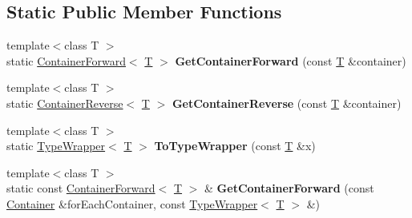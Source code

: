 \subsection*{Static Public Member Functions}
\begin{DoxyCompactItemize}
\item 
\mbox{\label{class_gost_crypt_1_1_for_each_affc637c093b1d7c0447db90a35e60d18}} 
{\footnotesize template$<$class T $>$ }\\static \hyperlink{struct_gost_crypt_1_1_for_each_1_1_container_forward}{Container\+Forward}$<$ \hyperlink{_stribog_8c_aba2f4c400d7a4c0bf0296be622087314}{T} $>$ {\bfseries Get\+Container\+Forward} (const \hyperlink{_stribog_8c_aba2f4c400d7a4c0bf0296be622087314}{T} \&container)
\item 
\mbox{\label{class_gost_crypt_1_1_for_each_a9ed7e80c545302d6be900bd61ac13681}} 
{\footnotesize template$<$class T $>$ }\\static \hyperlink{struct_gost_crypt_1_1_for_each_1_1_container_reverse}{Container\+Reverse}$<$ \hyperlink{_stribog_8c_aba2f4c400d7a4c0bf0296be622087314}{T} $>$ {\bfseries Get\+Container\+Reverse} (const \hyperlink{_stribog_8c_aba2f4c400d7a4c0bf0296be622087314}{T} \&container)
\item 
\mbox{\label{class_gost_crypt_1_1_for_each_a438795710577c68583b338a05ce99b74}} 
{\footnotesize template$<$class T $>$ }\\static \hyperlink{struct_gost_crypt_1_1_for_each_1_1_type_wrapper}{Type\+Wrapper}$<$ \hyperlink{_stribog_8c_aba2f4c400d7a4c0bf0296be622087314}{T} $>$ {\bfseries To\+Type\+Wrapper} (const \hyperlink{_stribog_8c_aba2f4c400d7a4c0bf0296be622087314}{T} \&x)
\item 
\mbox{\label{class_gost_crypt_1_1_for_each_a95a2d89a754cc9aecef31d4e204eb06d}} 
{\footnotesize template$<$class T $>$ }\\static const \hyperlink{struct_gost_crypt_1_1_for_each_1_1_container_forward}{Container\+Forward}$<$ \hyperlink{_stribog_8c_aba2f4c400d7a4c0bf0296be622087314}{T} $>$ \& {\bfseries Get\+Container\+Forward} (const \hyperlink{struct_gost_crypt_1_1_for_each_1_1_container}{Container} \&for\+Each\+Container, const \hyperlink{struct_gost_crypt_1_1_for_each_1_1_type_wrapper}{Type\+Wrapper}$<$ \hyperlink{_stribog_8c_aba2f4c400d7a4c0bf0296be622087314}{T} $>$ \&)

\end{DoxyCompactItemize}
